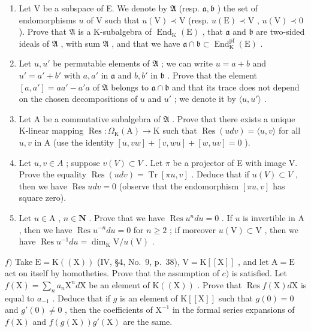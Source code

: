 \begin{enumerate}
\def\labelenumi{\alph{enumi})}
\item
  Let V be a subspace of E. We denote by \(\mathfrak{A}\) (resp. \(\mathfrak{a},\mathfrak{b}\) ) the set of endomorphisms \(u\) of V such that \(u(\mathrm{V})\prec \mathrm{V}\) (resp. \(u(\mathrm{E})\prec \mathrm{V}\) , \(u(\mathrm{V})\prec 0\) ). Prove that \(\mathfrak{A}\) is a K-subalgebra of \(\operatorname{End}_{\mathrm{K}}(\mathrm{E})\) , that \(\mathfrak{a}\) and \(\mathfrak{b}\) are two-sided ideals of \(\mathfrak{A}\) , with sum \(\mathfrak{A}\) , and that we have \(\mathfrak{a} \cap \mathfrak{b} \subset \operatorname{End}_{\mathrm{K}}^{\mathrm{pf}}(\mathrm{E})\) .
\item
  Let \(u, u'\) be permutable elements of \(\mathfrak{A}\) ; we can write \(u = a + b\) and \(u' = a' + b'\) with \(a, a'\) in \(\mathfrak{a}\) and \(b, b'\) in \(\mathfrak{b}\) . Prove that the element \([a, a'] = aa' - a'a\) of \(\mathfrak{A}\) belongs to \(\mathfrak{a} \cap \mathfrak{b}\) and that its trace does not depend on the chosen decompositions of \(u\) and \(u'\) ; we denote it by \(\langle u, u' \rangle\) .
\item
  Let A be a commutative subalgebra of \(\mathfrak{A}\) . Prove that there exists a unique K-linear mapping \(\operatorname{Res}:\Omega_{\mathrm{K}}(\mathrm{A})\to \mathrm{K}\) such that \(\operatorname{Res}(udv) = \langle u,v\rangle\) for all \(u,v\) in A (use the identity \([u,vw] + [v,wu] + [w,uv] = 0\) ).
\item
  Let \(u, v \in A\) ; suppose \(v(V) \subset V\) . Let \(\pi\) be a projector of E with image V. Prove the equality \(\operatorname{Res}(u dv) = \operatorname{Tr}[\pi u, v]\) . Deduce that if \(u(V) \subset V\) , then we have \(\operatorname{Res} u dv = 0\) (observe that the endomorphism \([\pi u, v]\) has square zero).
\item
  Let \(u \in \mathrm{A}\) , \(n \in \mathbf{N}\) . Prove that we have \(\operatorname{Res} u^n du = 0\) . If \(u\) is invertible in \(\mathrm{A}\) , then we have \(\operatorname{Res} u^{-n} du = 0\) for \(n \geqslant 2\) ; if moreover \(u(\mathrm{V}) \subset \mathrm{V}\) , then we have \(\operatorname{Res} u^{-1} du = \dim_{\mathrm{K}} \mathrm{V} / u(\mathrm{V})\) .
\end{enumerate}

\(f)\) Take \(\mathrm{E} = \mathrm{K}((\mathrm{X}))\) (IV, §4, No.~9, p.~38), \(\mathrm{V} = \mathrm{K}[[\mathrm{X}]]\) , and let \(\mathrm{A} = \mathrm{E}\) act on itself by homotheties. Prove that the assumption of \(c)\) is satisfied. Let \(f(\mathrm{X}) = \sum_{n} a_{n} \mathrm{X}^{n} d\mathrm{X}\) be an element of \(\mathrm{K}((\mathrm{X}))\) . Prove that \(\operatorname{Res} f(\mathrm{X}) d\mathrm{X}\) is equal to \(a_{-1}\) . Deduce that if \(g\) is an element of \(\mathrm{K}[[\mathrm{X}]]\) such that \(g(0) = 0\) and \(g'(0) \neq 0\) , then the coefficients of \(\mathrm{X}^{-1}\) in the formal series expansions of \(f(\mathrm{X})\) and \(f(g(\mathrm{X})) g'( \mathrm{X})\) are the same.

\backmatter
